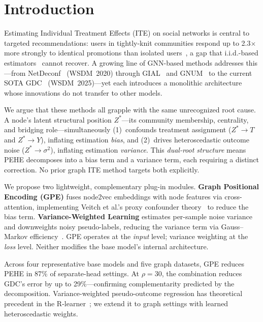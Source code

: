 \documentclass[sigconf,anonymous,review]{acmart}
\begin{document}
\maketitle

\section{Introduction}\label{sec:intro}

Estimating Individual Treatment Effects (ITE) on social networks is central to targeted recommendations: users in tightly-knit communities respond up to 2.3$\times$ more strongly to identical promotions than isolated users~\cite{luo2021behavioural}, a gap that i.i.d.-based estimators~\cite{kunzel2019metalearners, shalit2017estimating} cannot recover. A growing line of GNN-based methods addresses this---from NetDeconf~\cite{guo2020learning} (WSDM~2020) through GIAL~\cite{chu2021graph} and GNUM~\cite{zhu2023gnum} to the current SOTA GDC~\cite{hu2025gdc} (WSDM~2025)---yet each introduces a monolithic architecture whose innovations do not transfer to other models.

We argue that these methods all grapple with the same unrecognized root cause. A node's latent structural position $Z^*$---its community membership, centrality, and bridging role---simultaneously (1)~confounds treatment assignment ($Z^* \to T$ and $Z^* \to Y$), inflating estimation \emph{bias}, and (2)~drives heteroscedastic outcome noise ($Z^* \to \sigma^2$), inflating estimation \emph{variance}. This \emph{dual-root structure} means PEHE decomposes into a bias term and a variance term, each requiring a distinct correction. No prior graph ITE method targets both explicitly.

We propose two lightweight, complementary plug-in modules. \textbf{Graph Positional Encoding (GPE)} fuses node2vec embeddings with node features via cross-attention, implementing Veitch et al.'s proxy confounder theory~\cite{veitch2019using} to reduce the bias term. \textbf{Variance-Weighted Learning} estimates per-sample noise variance and downweights noisy pseudo-labels, reducing the variance term via Gauss--Markov efficiency~\cite{Aitken_1936}. GPE operates at the \emph{input} level; variance weighting at the \emph{loss} level. Neither modifies the base model's internal architecture.

Across four representative base models and five graph datasets, GPE reduces PEHE in 87\% of separate-head settings. At $\rho{=}30$, the combination reduces GDC's error by up to 29\%---confirming complementarity predicted by the decomposition. Variance-weighted pseudo-outcome regression has theoretical precedent in the R-learner~\cite{nie2021rlearner}; we extend it to graph settings with learned heteroscedastic weights.
\end{document}
